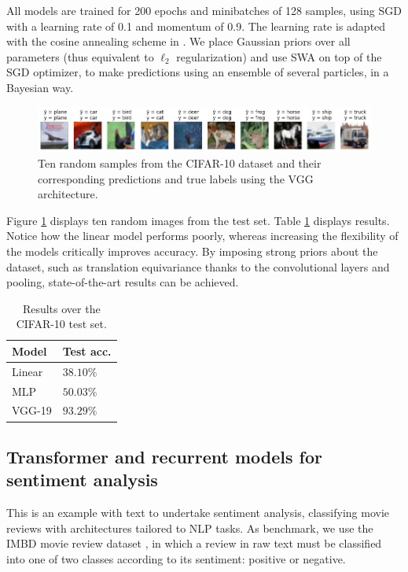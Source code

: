 All models are trained for 200 epochs and minibatches of 128 samples, using SGD with a learning rate of 0.1 and  momentum of 0.9.
The learning rate is adapted with the cosine annealing scheme in  \cite{loshchilov2016sgdr}. We place Gaussian priors over all parameters (thus equivalent to $\ell_2$ regularization) and use SWA on top of the SGD optimizer, to make predictions using an ensemble of several particles, in a Bayesian way.

\begin{figure}[hbt]
\centering
  \includegraphics[width=1.\linewidth]{figures/cifar.png}
  \caption{Ten random samples from the CIFAR-10 dataset and their corresponding predictions and true labels using the VGG architecture.}
  \label{fig:cifar}
\end{figure}

Figure \ref{fig:cifar} displays ten random images from the test set.  Table \ref{tab:cnn} displays results. Notice how the linear model performs poorly, whereas increasing the flexibility of the models critically improves 
accuracy. By imposing strong priors about the dataset, such as translation equivariance thanks to the convolutional layers and pooling, state-of-the-art results can be achieved.

\begin{table}[h]
\caption{Results over the CIFAR-10 test set.}
\centering
\begin{tabular}{ll}
Model & Test acc. \\
\hline
Linear &  $38.10\%$ \\
MLP &  $50.03\%$\\
VGG-19 &  $93.29\%$ 
\end{tabular}
\label{tab:cnn}
\end{table}

\subsection{Transformer and recurrent models for sentiment analysis}
This is an example with text to undertake sentiment analysis, classifying movie reviews with architectures tailored to NLP tasks. As benchmark, we use the IMBD movie review dataset \citep{maas-EtAl:2011:ACL-HLT2011}, in which a review in raw text must be classified into one of two classes according to its sentiment: positive or negative. 

